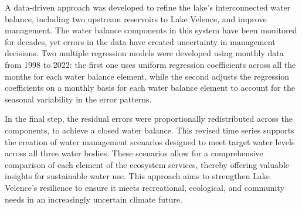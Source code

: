 A data-driven approach was developed to refine the lake's interconnected water balance, including two upstream reservoirs to Lake Velence, and improve management. The water balance components in this system have been monitored for decades, yet errors in the data have created uncertainty in management decisions. Two multiple regression models were developed using monthly data from 1998 to 2022: the first one uses uniform regression coefficients across all the months for each water balance element, while the second adjusts the regression coefficients on a monthly basis for each water balance element to account for the seasonal variability in the error patterns.

In the final step, the residual errors were proportionally redistributed across the components, to achieve a closed water balance. This revised time series supports the creation of water management scenarios designed to meet target water levels across all three water bodies. These scenarios allow for a comprehensive comparison of each element of the ecosystem services, thereby offering valuable insights for sustainable water use. This approach aims to strengthen Lake Velence's resilience to ensure it meets recreational, ecological, and community needs in an increasingly uncertain climate future.
\newpage{}
{}
\begin{flushleft}





\end{flushleft}

\noindent

